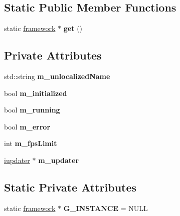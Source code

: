 \subsection*{Static Public Member Functions}
\begin{DoxyCompactItemize}
\item 
\mbox{\label{classflounder_1_1framework_a1b1dbf1058cc4589b090326baf1beb87}} 
static \hyperlink{classflounder_1_1framework}{framework} $\ast$ {\bfseries get} ()
\end{DoxyCompactItemize}
\subsection*{Private Attributes}
\begin{DoxyCompactItemize}
\item 
\mbox{\label{classflounder_1_1framework_a0c8838aa68911d49e5d645a76cd4c882}} 
std\+::string {\bfseries m\+\_\+unlocalized\+Name}
\item 
\mbox{\label{classflounder_1_1framework_aa8d5bd06f84d96cd899a2dc0a923f6c0}} 
bool {\bfseries m\+\_\+initialized}
\item 
\mbox{\label{classflounder_1_1framework_ae35bf0984c893efe82cdedfd0a5ff99c}} 
bool {\bfseries m\+\_\+running}
\item 
\mbox{\label{classflounder_1_1framework_a330204f666427dfaeb7b0e2557b678e9}} 
bool {\bfseries m\+\_\+error}
\item 
\mbox{\label{classflounder_1_1framework_a1d378181c630d013eb5841eaad4b0f3a}} 
int {\bfseries m\+\_\+fps\+Limit}
\item 
\mbox{\label{classflounder_1_1framework_a5b02f37837a680807cb9e84e7172a6a3}} 
\hyperlink{classflounder_1_1iupdater}{iupdater} $\ast$ {\bfseries m\+\_\+updater}
\end{DoxyCompactItemize}
\subsection*{Static Private Attributes}
\begin{DoxyCompactItemize}
\item 
\mbox{\label{classflounder_1_1framework_a896bceb89f218cbfc92592b1c24929e9}} 
static \hyperlink{classflounder_1_1framework}{framework} $\ast$ {\bfseries G\+\_\+\+I\+N\+S\+T\+A\+N\+CE} = N\+U\+LL
\end{DoxyCompactItemize}


